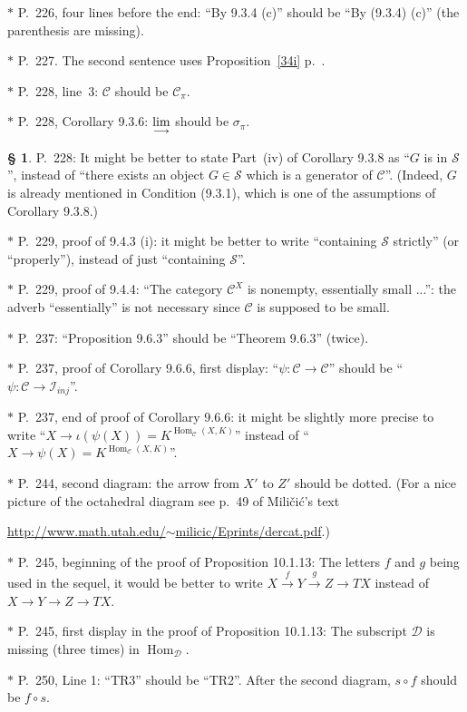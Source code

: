 \documentclass[12pt]{article}
\theoremstyle{remark}
\theoremstyle{definition}
\newtheorem{s}[thm]{\S}
\newcommand{\nn}{\noindent}
\newcommand{\cc}{\mathcal}
\newcommand{\C}{\mathcal C}
\newcommand{\xr}{\xrightarrow}
\newcommand{\ilim}{\operatornamewithlimits{\underset{\longrightarrow}{lim}}}
\DeclareMathOperator{\Hom}{Hom}
\begin{document}
\nn$*$ P.~226, four lines before the end: ``By 9.3.4 (c)'' should be ``By (9.3.4) (c)'' (the parenthesis are missing).

\nn$*$ P.~227. The second sentence uses Proposition~\ref{34i} p.~\pageref{34i}.

\nn$*$ P.~228, line~3: $\C$ should be $\C_\pi$.

\nn$*$ P.~228, Corollary 9.3.6: $\ilim$ should be $\sigma_\pi$.

\begin{s}\label{228}
P.~228: It might be better to state Part~(iv) of Corollary 9.3.8 as ``$G$ is in $\cc S$'', instead of ``there exists an object $G\in\cc S$ which is a generator of $\C$''. (Indeed, $G$ is already mentioned in Condition (9.3.1), which is one of the assumptions of Corollary 9.3.8.)
\end{s}

\nn$*$ P.~229, proof of 9.4.3 (i): it might be better to write ``containing $\mathcal S$ strictly'' (or ``properly''), instead of just ``containing $\mathcal S$''. 

\nn$*$ P.~229, proof of 9.4.4: ``The category $\C^X$ is nonempty, essentially small ...'': the adverb ``essentially'' is not necessary since $\C$ is supposed to be small.

\nn$*$ P.~237: ``Proposition 9.6.3'' should be ``Theorem 9.6.3'' (twice). 

\nn$*$ P.~237, proof of Corollary 9.6.6, first display: ``$\psi:\C\to\C$'' should be ``$\psi:\C\to\mathcal I_{inj}$''. 

\nn$*$ P.~237, end of proof of Corollary 9.6.6: it might be slightly more precise to write ``$X\to\iota(\psi(X))=K^{\Hom_\C(X,K)}$'' instead of ``$X\to\psi(X)=K^{\Hom_\C(X,K)}$''.

\nn$*$ P.~244, second diagram: the arrow from $X'$ to $Z'$ should be dotted. (For a nice picture of the octahedral diagram see p.~49 of Mili\v{c}i\'c's text

\href{http://www.math.utah.edu/~milicic/Eprints/dercat.pdf}{http://www.math.utah.edu/$\sim$milicic/Eprints/dercat.pdf}.)

\nn$*$ P.~245, beginning of the proof of Proposition 10.1.13: The letters $f$ and $g$ being used in the sequel, it would be better to write $X\xr fY\xr gZ\to TX$ instead of $X\to Y\to Z\to TX$. 

\nn$*$ P.~245, first display in the proof of Proposition 10.1.13: The subscript $\cc D$ is missing (three times) in $\Hom_{\cc D}$.

\nn$*$ P.~250, Line 1: ``TR3'' should be ``TR2''. After the second diagram, $s\circ f$ should be $f\circ s$.
\end{document}
